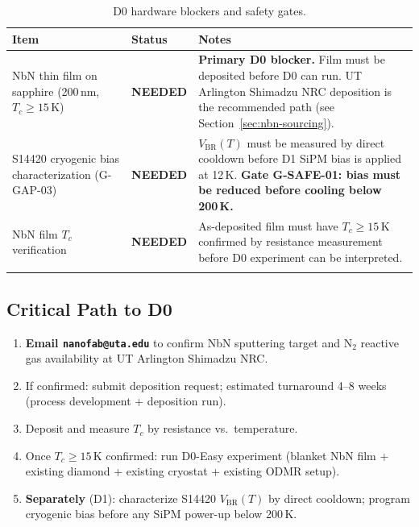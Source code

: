 \begin{longtable}{@{}p{3.5cm}p{2cm}p{7cm}@{}}
\toprule
\textbf{Item} & \textbf{Status} & \textbf{Notes} \\
\midrule
\endhead
NbN thin film on sapphire (200\,nm, $T_c \geq 15$\,K) &
  \textbf{NEEDED} &
  \textbf{Primary D0 blocker.} Film must be deposited before D0 can run.
  UT Arlington Shimadzu NRC deposition is the recommended path
  (see Section~\ref{sec:nbn-sourcing}). \\[4pt]
S14420 cryogenic bias characterization (G-GAP-03) &
  \textbf{NEEDED} &
  $V_\mathrm{BR}(T)$ must be measured by direct cooldown before D1 SiPM bias is applied
  at 12\,K. \textbf{Gate G-SAFE-01: bias must be reduced before cooling below 200\,K.}
  \\[4pt]
NbN film $T_c$ verification & \textbf{NEEDED} &
  As-deposited film must have $T_c \geq 15$\,K confirmed by resistance measurement
  before D0 experiment can be interpreted.
  \\
\midrule
\caption{D0 hardware blockers and safety gates.}
\label{tab:hw_blockers}
\endlastfoot
\bottomrule
\end{longtable}

\subsection{Critical Path to D0}

\begin{enumerate}
  \item \textbf{Email \texttt{nanofab@uta.edu}} to confirm NbN sputtering target and N$_2$
    reactive gas availability at UT Arlington Shimadzu NRC.
  \item If confirmed: submit deposition request; estimated turnaround 4--8 weeks (process
    development + deposition run). %
  \item Deposit and measure $T_c$ by resistance vs.\ temperature.
  \item Once $T_c \geq 15$\,K confirmed: run D0-Easy experiment
    (blanket NbN film + existing diamond + existing cryostat + existing ODMR setup).
  \item \textbf{Separately} (D1): characterize S14420 $V_\mathrm{BR}(T)$ by direct cooldown;
    program cryogenic bias before any SiPM power-up below 200\,K.
\end{enumerate}


